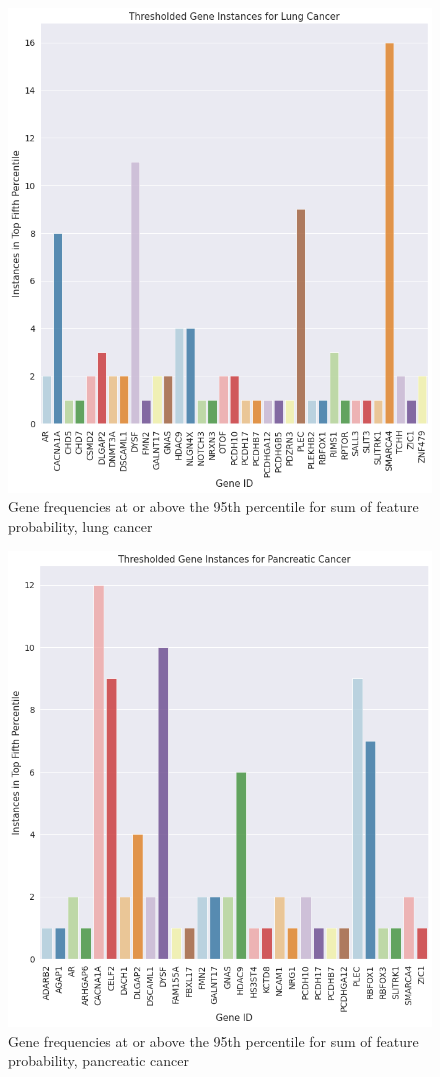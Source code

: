 \documentclass{article}
\begin{document}
\begin{figure}[h!]
    \centering
    \includegraphics[scale=0.5]{figures/lung.png}
    \caption{Gene frequencies at or above the 95th percentile  for sum of feature probability, lung cancer}
    \label{fig:my_label}
\end{figure}

\begin{figure}[h!]
    \centering
    \includegraphics[scale=0.5]{figures/pancreatic.png}
    \caption{Gene frequencies at or above the 95th percentile  for sum of feature probability, pancreatic cancer}
    \label{fig:my_label}
\end{figure}
\end{document}
